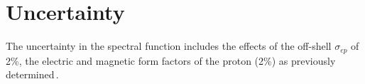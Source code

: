 \section{Uncertainty}
The uncertainty in the spectral function includes the effects of the off-shell
$\sigma_{ep}$ of 2\%, the electric and magnetic form factors of the proton (2\%)
as previously determined\,\cite{ONeill_1995}.
